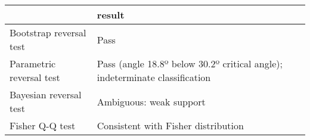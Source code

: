 \begin{tabular}{ll}
\toprule
{} &                                                                       result \\
\midrule
Bootstrap reversal test  &                                                                         Pass \\
Parametric reversal test &  Pass (angle 18.8º below 30.2º critical angle); indeterminate classification \\
Bayesian reversal test   &                                                      Ambiguous: weak support \\
Fisher Q-Q test          &                                          Consistent with Fisher distribution \\
\bottomrule
\end{tabular}
